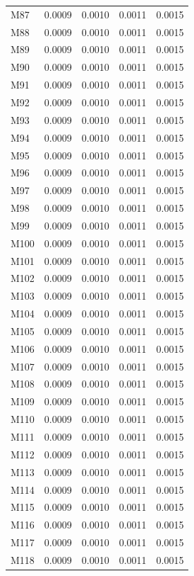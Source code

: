 \begin{longtable}{lrrrr}
M87 & 0.0009 & 0.0010 & 0.0011 & 0.0015 \\
M88 & 0.0009 & 0.0010 & 0.0011 & 0.0015 \\
M89 & 0.0009 & 0.0010 & 0.0011 & 0.0015 \\
M90 & 0.0009 & 0.0010 & 0.0011 & 0.0015 \\
M91 & 0.0009 & 0.0010 & 0.0011 & 0.0015 \\
M92 & 0.0009 & 0.0010 & 0.0011 & 0.0015 \\
M93 & 0.0009 & 0.0010 & 0.0011 & 0.0015 \\
M94 & 0.0009 & 0.0010 & 0.0011 & 0.0015 \\
M95 & 0.0009 & 0.0010 & 0.0011 & 0.0015 \\
M96 & 0.0009 & 0.0010 & 0.0011 & 0.0015 \\
M97 & 0.0009 & 0.0010 & 0.0011 & 0.0015 \\
M98 & 0.0009 & 0.0010 & 0.0011 & 0.0015 \\
M99 & 0.0009 & 0.0010 & 0.0011 & 0.0015 \\
M100 & 0.0009 & 0.0010 & 0.0011 & 0.0015 \\
M101 & 0.0009 & 0.0010 & 0.0011 & 0.0015 \\
M102 & 0.0009 & 0.0010 & 0.0011 & 0.0015 \\
M103 & 0.0009 & 0.0010 & 0.0011 & 0.0015 \\
M104 & 0.0009 & 0.0010 & 0.0011 & 0.0015 \\
M105 & 0.0009 & 0.0010 & 0.0011 & 0.0015 \\
M106 & 0.0009 & 0.0010 & 0.0011 & 0.0015 \\
M107 & 0.0009 & 0.0010 & 0.0011 & 0.0015 \\
M108 & 0.0009 & 0.0010 & 0.0011 & 0.0015 \\
M109 & 0.0009 & 0.0010 & 0.0011 & 0.0015 \\
M110 & 0.0009 & 0.0010 & 0.0011 & 0.0015 \\
M111 & 0.0009 & 0.0010 & 0.0011 & 0.0015 \\
M112 & 0.0009 & 0.0010 & 0.0011 & 0.0015 \\
M113 & 0.0009 & 0.0010 & 0.0011 & 0.0015 \\
M114 & 0.0009 & 0.0010 & 0.0011 & 0.0015 \\
M115 & 0.0009 & 0.0010 & 0.0011 & 0.0015 \\
M116 & 0.0009 & 0.0010 & 0.0011 & 0.0015 \\
M117 & 0.0009 & 0.0010 & 0.0011 & 0.0015 \\
M118 & 0.0009 & 0.0010 & 0.0011 & 0.0015 \\

\end{longtable}
